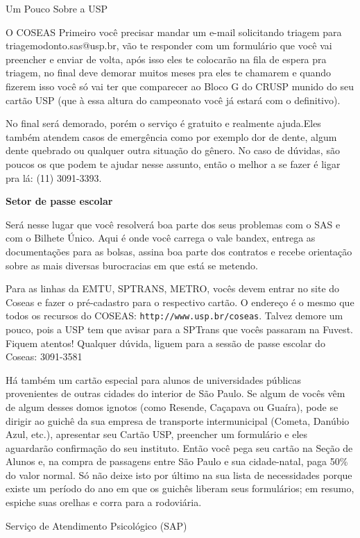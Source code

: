 \begin{secao}{Um Pouco Sobre a USP}
\begin{subsecao}{O COSEAS}
Primeiro você precisar mandar um e-mail solicitando triagem para triagemodonto.sas@usp.br,
vão te responder com um formulário que você vai preencher e enviar de volta, após isso eles
te colocarão na fila de espera pra triagem, no final deve demorar muitos meses pra
eles te chamarem e quando fizerem isso você só vai ter que comparecer ao Bloco G do CRUSP
munido do seu cartão USP (que à essa altura do campeonato você já estará com o definitivo).

No final será demorado, porém o serviço é gratuito e realmente ajuda.Eles também atendem casos
de emergência como por exemplo dor de dente, algum dente quebrado ou qualquer outra situação
do gênero. No caso de dúvidas, são poucos os que podem te ajudar nesse assunto, então o melhor
a se fazer é ligar pra lá: (11) 3091-3393.


{\bf Setor de passe escolar}

Será nesse lugar que você resolverá boa parte dos seus problemas com o SAS e com o
Bilhete Único. Aqui é onde você carrega o vale bandex, entrega as documentações para
as bolsas, assina boa parte dos contratos e recebe orientação sobre as mais diversas
burocracias em que está se metendo.

Para as linhas da EMTU, SPTRANS, METRO, vocês devem entrar no site do Coseas e fazer
o pré-cadastro para o respectivo cartão. O endereço é o mesmo que todos os recursos
do COSEAS: {\tt http://www.usp.br/coseas}. Talvez demore um pouco, pois a USP tem que
avisar para a SPTrans que vocês passaram na Fuvest. Fiquem atentos! Qualquer dúvida,
liguem para a sessão de passe escolar do Coseas: 3091-3581

Há também um cartão especial para alunos de universidades públicas provenientes
de outras cidades do interior de São Paulo. Se algum de vocês vêm de algum desses domos
ignotos (como Resende, Caçapava ou Guaíra), pode se dirigir ao guichê da sua empresa de
transporte intermunicipal (Cometa, Danúbio Azul, etc.), apresentar seu Cartão USP,
preencher um formulário e eles aguardarão confirmação do seu instituto. Então
você pega seu cartão na Seção de Alunos e, na compra de passagens entre São Paulo
e sua cidade-natal, paga 50\% do valor normal. Só não deixe isto por último na
sua lista de necessidades porque existe um período do ano em que os guichês
liberam seus formulários; em resumo, espiche suas orelhas e corra para a rodoviária.

\end{subsecao}

\begin{subsecao}{Serviço de Atendimento Psicológico (SAP)}


\end{subsecao}
\end{secao}
